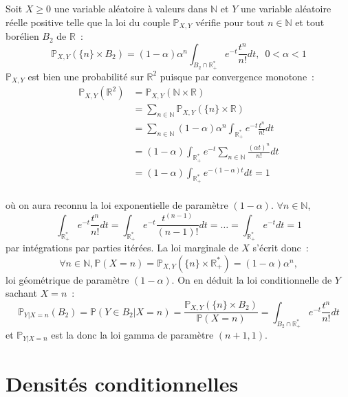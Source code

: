 \begin{exemple}\label{III-ex1}

Soit \(X \geq 0\) une variable aléatoire à valeurs dans \(\mathbb{N}\)
et \(Y\) une variable aléatoire réelle positive telle que la loi du
couple \(\mathbb{P}_{X,Y}\) vérifie pour tout \(n\in\mathbb{N}\) et tout
borélien \(B_2\) de \(\mathbb{R}\)~:
\[\mathbb{P}_{X,Y} (\{n\}\times B_2) = (1-\alpha)\alpha^n \int_{B_2 \cap \mathbb{R}_+^\ast}e^{-t}\frac{t^n}{n!}dt,\,\,\, 0 < \alpha <1\]
\(\mathbb{P}_{X,Y}\) est bien une probabilité sur \(\mathbb{R}^2\)
puisque par convergence monotone~: \begin{align*}
\mathbb{P}_{X,Y} (\mathbb{R}^2) &= \mathbb{P}_{X,Y}(\mathbb{N}\times \mathbb{R}) \\
                &= \sum_{n\in\mathbb{N}} \mathbb{P}_{X,Y} (\{n\}\times \mathbb{R})\\
                &= \sum_{n\in\mathbb{N}} (1-\alpha)\alpha^n \int_{\mathbb{R}_+^\ast}e^{-t}\frac{t^n}{n!}dt \\
                &= (1-\alpha)\int_{\mathbb{R}_+^\ast}e^{-t} \sum_{n\in\mathbb{N}} \frac{(\alpha t)^n}{n!}dt \\
                &= (1-\alpha)\int_{\mathbb{R}_+^\ast}e^{-(1-\alpha)t} dt = 1
\end{align*}\\
où on aura reconnu la loi exponentielle de paramètre \((1-\alpha)\).
\(\forall n \in \mathbb{N}\),
\[ \int_{\mathbb{R}_+^\ast}e^{-t}\frac{t^n}{n!}dt = \int_{\mathbb{R}_+^\ast}e^{-t}\frac{t^{(n-1)}}{(n-1)!}dt = \ldots = \int_{\mathbb{R}_+^\ast}e^{-t}dt =1\]
par intégrations par parties itérées. La loi marginale de \(X\) s'écrit
donc~:
\[\forall n \in \mathbb{N}, \mathbb{P}(X=n) = \mathbb{P}_{X,Y} (\{n\}\times \mathbb{R}_+^\ast) = (1-\alpha)\alpha^n,\]
loi géométrique de paramètre \((1-\alpha)\). On en déduit la loi
conditionnelle de \(Y\) sachant \(X = n\)~:
\[\mathbb{P}_{Y|X=n}(B_2) = \mathbb{P}(Y \in B_2 | X=n) = \frac{\mathbb{P}_{X,Y} (\{n\}\times B_2)}{\mathbb{P}(X=n)} = \int_{B_2 \cap \mathbb{R}_+^\ast} e^{-t}\frac{t^n}{n!}dt\]
et \(\mathbb{P}_{Y|X=n}\) est la donc la loi gamma de paramètre
\((n+1,1)\).
\end{exemple}

\section{Densités
conditionnelles}\label{III-densituxe9s-conditionnelles}


